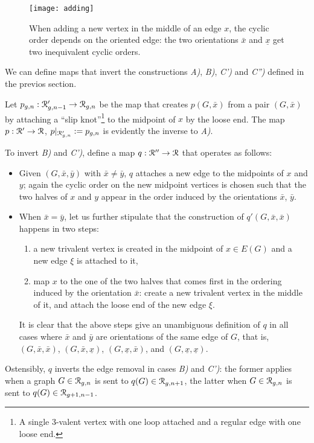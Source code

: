 \begin{figure}[bh]
  \centering
  \texttt{[image: adding]}
  \caption{When adding a new vertex in the middle of an edge $x$, the cyclic order depends on the oriented edge: the two orientations $\bar{x}$ and $\underline{x}$ get two inequivalent cyclic orders.}
  \label{fig:adding}
\end{figure}

We can define maps that invert the constructions {\sl A)}, {\sl B)},
{\sl C')} and {\sl C'')} defined in the previos section.

Let $p_{g,n} : \mathcal{R}'_{g,n-1} \to \mathcal{R}_{g,n}$ be the map that creates
$p(G,\bar{x})$ from a pair $(G, \bar{x})$ by attaching a ``slip
knot''\footnote{A single 3-valent vertex with one loop attached and a
  regular edge with one loose end.} to the midpoint of $x$ by the
loose end.  The map $p: \mathcal{R}' \to \mathcal{R}$, $p|_{\mathcal{R}'_{g,n}} := p_{g,n}$ is
evidently the inverse to {\sl A)}.

To invert {\sl B)} and {\sl C')}, define a map $q : \mathcal{R}'' \to \mathcal{R}$ that
operates as follows:
\begin{itemize}
\item Given $(G, \bar{x}, \bar{y})$ with $\bar{x} \not= \bar{y}$, $q$
  attaches a new edge to the midpoints of $x$ and $y$; again the
  cyclic order on the new midpoint vertices is chosen such that the
  two halves of $x$ and $y$ appear in the order induced by the
  orientations $\bar x$, $\bar y$.
\item When $\bar{x} = \bar{y}$, let us further stipulate that the
  construction of $q'(G, \bar{x}, \bar{x})$ happens in two steps:
  \begin{enumerate}
  \item a new trivalent vertex is created in the midpoint of $x \in
    E(G)$ and a new edge $\xi$ is attached to it,
  \item map $x$ to the one of the two halves that comes first in the
    ordering induced by the orientation $\bar{x}$: create a new
    trivalent vertex in the middle of it, and attach the loose end of
    the new edge $\xi$.
  \end{enumerate}
  It is clear that the above steps give an unambiguous definition of
  $q$ in all cases where $\bar{x}$ and $\bar{y}$ are orientations of
  the same edge of $G$, that is, $(G, \bar{x}, \bar{x})$, $(G,
  \bar{x}, \underline{x})$, $(G, \underline{x}, \bar{x})$, and $(G,
  \underline{x}, \underline{x})$.
\end{itemize}
Ostensibly, $q$ inverts the edge removal in cases {\sl B)} and {\sl
  C')}: the former applies when a graph $G \in \mathcal{R}_{g,n}$ is sent to
$q(G) \in \mathcal{R}_{g,n+1}$, the latter when $G \in \mathcal{R}_{g,n}$ is sent to
$q(G) \in \mathcal{R}_{g+1,n-1}$.

